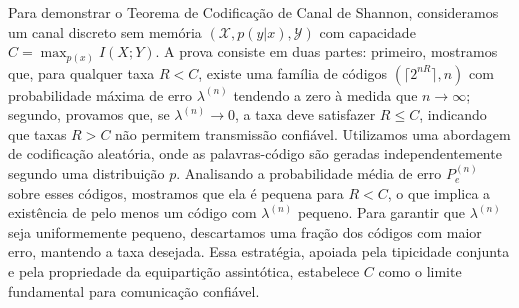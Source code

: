 Para demonstrar o Teorema de Codificação de Canal de Shannon, consideramos um
canal discreto sem memória $(\mathcal{X}, p(y|x), \mathcal{Y})$ com capacidade 
$C = \max_{p(x)} I(X;Y)$. A prova consiste em duas partes: primeiro, mostramos que, para
qualquer taxa $R < C$, existe uma família de códigos $(\lceil 2^{nR} \rceil, n)$ 
com probabilidade máxima de erro $\lambda^{(n)}$ tendendo a zero à medida
que $n \to \infty$; segundo, provamos que, se $\lambda^{(n)} \to 0$, a taxa
deve satisfazer $R \leq C$, indicando que taxas $R > C$ não permitem
transmissão confiável. Utilizamos uma abordagem de codificação aleatória, onde
as palavras-código são geradas independentemente segundo uma distribuição
$p$. Analisando a probabilidade média de erro $P_e^{(n)}$ sobre esses
códigos, mostramos que ela é pequena para $R < C$, o que implica a existência
de pelo menos um código com $\lambda^{(n)}$ pequeno. Para garantir que
$\lambda^{(n)}$ seja uniformemente pequeno, descartamos uma fração dos códigos
com maior erro, mantendo a taxa desejada. Essa estratégia, apoiada pela
tipicidade conjunta e pela propriedade da equipartição assintótica, estabelece
$C$ como o limite fundamental para comunicação confiável.






